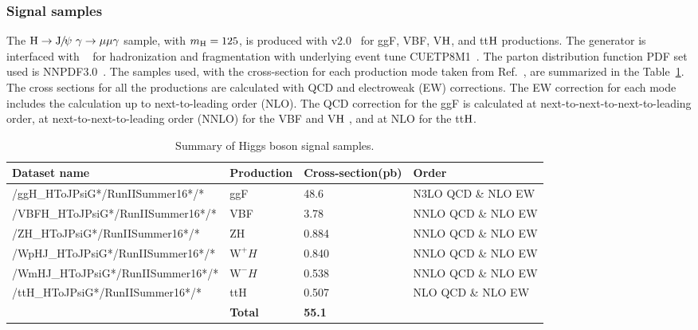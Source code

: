 		\subsubsection*{Signal samples}
		The $\PH\to\JPsi\ \gamma\to\mu\mu\gamma$ sample, with $m_{\mathrm{H}}=125$\GeV, is produced with \POWHEG v2.0~\cite{Alioli:2008tz,Nason:2009ai} for ggF, VBF, V$\mathrm{H}$, and tt$\mathrm{H}$ productions. The generator is interfaced with ~\cite{SJOSTRAND2008852,Sjostrand:2014zea} for hadronization and fragmentation with underlying event tune CUETP8M1~\cite{Khachatryan:2015pea}. 
The parton distribution function PDF set used is NNPDF3.0~\cite{Ball:2014uwa}. The samples used, with the cross-section for each production mode taken from Ref.~\cite{LHCHXSWG}, are summarized in the Table~\ref{tab:HiggsSample}. The cross sections for all the productions are calculated with QCD and electroweak (EW) corrections. The EW correction for each mode includes the calculation up to next-to-leading order (NLO). The QCD correction for the ggF is calculated at next-to-next-to-next-to-leading order, at next-to-next-to-leading order (NNLO) for the VBF and V$\mathrm{H}$ , and at NLO for the tt$\mathrm{H}$. 		
		\begin{table}[!ht]
		\scriptsize
		  \begin{center}
		    \begin{tabular}{|l|l|l|l|}
		    \hline
		      Dataset name & Production                                & Cross-section(pb)   & Order                    \\ 
		      \hline
		      /ggH\_HToJPsiG*/RunIISummer16*/* & ggF   & 48.6   & N3LO QCD \& NLO EW  \\
		      /VBFH\_HToJPsiG*/RunIISummer16*/* & VBF   & 3.78   & NNLO QCD \& NLO EW \\
		      /ZH\_HToJPsiG*/RunIISummer16*/* & ZH   & 0.884   & NNLO QCD \& NLO EW  \\
		      /WpHJ\_HToJPsiG*/RunIISummer16*/* & $\text{W}^{+}H$   & 0.840 & NNLO QCD \& NLO EW    \\
		      /WmHJ\_HToJPsiG*/RunIISummer16*/* & $\text{W}^{-}H$   & 0.538  & NNLO QCD \& NLO EW   \\
		      /ttH\_HToJPsiG*/RunIISummer16*/* & ttH   & 0.507    & NLO QCD \& NLO EW \\
		      \hline
		      & \textbf{Total}    & \textbf{55.1} &     \\
		      \hline
		    \end{tabular}
		    \caption{Summary of Higgs boson signal samples.\label{tab:HiggsSample}}
		  \end{center}
		\end{table}
		
